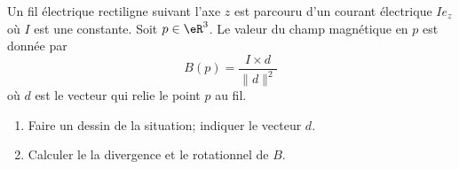 
\begin{exercice}\label{exoOutilsMath-0079}

    Un fil électrique rectiligne suivant l'axe $z$ est parcouru d'un courant électrique $Ie_z$ où $I$ est une constante. Soit $p\in\eR^3$. Le valeur du champ magnétique en $p$ est donnée par
    \begin{equation}
        B(p)=\frac{ I\times d }{ \| d \|^2 }
    \end{equation}
    où $d$ est le vecteur qui relie le point $p$ au fil.

    \begin{enumerate}
        \item
            Faire un dessin de la situation; indiquer le vecteur $d$.
        \item 
            Calculer le la divergence et le rotationnel de $B$.
    \end{enumerate}

\end{exercice}
